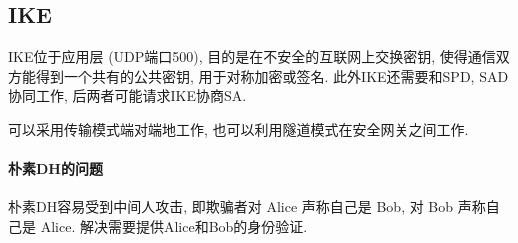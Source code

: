 \documentclass{ctexart}
\begin{document}
\subsection{IKE}
    IKE位于应用层 (UDP端口500), 目的是在不安全的互联网上交换密钥,
    使得通信双方能得到一个共有的公共密钥, 用于对称加密或签名.
    此外IKE还需要和SPD, SAD协同工作, 后两者可能请求IKE协商SA.
    \par
    可以采用传输模式端对端地工作, 也可以利用隧道模式在安全网关之间工作.\par

\paragraph{朴素DH的问题} 朴素DH容易受到中间人攻击,
    即欺骗者对 Alice 声称自己是 Bob, 对 Bob 声称自己是 Alice. 解决需要提供Alice和Bob的身份验证.
\end{document}
